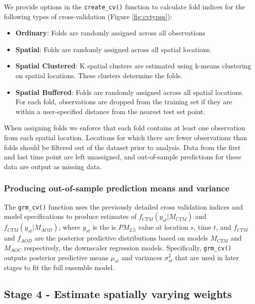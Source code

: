 \documentclass[12pt]{article}
\begin{document}
We provide options in the \texttt{create\_cv()} function to calculate fold indices for the following types of cross-validation (Figure \ref{fig:cvtypes}):

\begin{itemize}
  \item \textbf{Ordinary}: Folds are randomly assigned across all observations
  \item \textbf{Spatial}: Folds are randomly assigned across all spatial locations. 
  \item \textbf{Spatial Clustered}: K spatial clusters are estimated using k-means clustering on spatial locations. These clusters determine the folds. 
  \item \textbf{Spatial Buffered}: Folds are randomly assigned across all spatial locations. For each fold, observations are dropped from the training set if they are within a user-specified distance from the nearest test set point. 
\end{itemize}

When assigning folds we enforce that each fold contains at least one observation from each spatial location.
Locations for which there are fewer observations than folds should be filtered out of the dataset prior to analysis.
Data from the first and last time point are left unassigned, and out-of-sample predictions for these data are output as missing data.

\subsubsection*{Producing out-of-sample prediction means and variance}

The \texttt{grm\_cv()} function uses the previously detailed cross validation indices and model specifications to produce estimates of $f_{CTM}(y_{st} | M_{CTM})$ and $f_{CTM}(y_{st} | M_{AOD})$, where $y_{st}$ is the is $PM_{2.5}$ value at location $s$, time $t$, and $f_{CTM}$ and $f_{AOD}$ are the posterior predictive distributions based on models $M_{CTM}$ and $M_{AOC}$ respectively, the downscaler regression models. 
Specifically, \texttt{grm\_cv()} outputs posterior predictive means $\mu_{st}$ and variances $\sigma^2_{st}$ that are used in later stages to fit the full ensemble model. 



\subsection*{Stage 4 - Estimate spatially varying weights}
\end{document}
